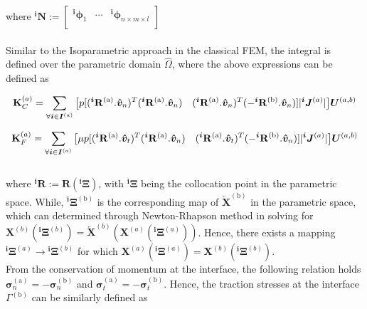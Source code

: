 where ${}^{\bm i} \bm N := 
\begin{bmatrix}
{}^{\bm i} \bm \phi_{1} &\cdots   &{}^{\bm i}\bm \phi_{n\times m \times l} \\ 
\end{bmatrix}$\\
\\
Similar to the Isoparametric approach in the classical FEM, the integral is defined over the parametric domain $\hat \Omega$, where the above expressions can be defined as

\begin{equation}\label{cont_dis2}
\mathbf{K}^{(a)}_C=
\sum_{\forall \bm i \in \bm I^{(a)}} \big[ p[({}^{\bm i} \mathbf{R}^{\mathrm{(a)}}.\bm{\hat{v}}_n)^T({}^{\bm i}\mathbf{R}^{\mathrm{(a)}}.\bm{\hat{v}}_n) \quad({}^{\bm i} \mathbf{R}^{\mathrm{(a)}}.\bm{\hat{v}}_n)^T(-{}^{\bm i} \mathbf{R}^{\mathrm{(b)}}.\bm{\hat{v}}_n)] |{}^{\bm i} \bm J^{(a)}| \big] \bm U^{(a,b)}\\
\end{equation}

\begin{equation}\label{fric_dis2}
\mathbf{K}^{(a)}_F=
\sum_{\forall \bm i \in \bm I^{(a)}} \big[ \mu p[({}^{\bm i} \mathbf{R}^{\mathrm{(a)}}.\bm{\hat{v}}_t)^T({}^{\bm i}\mathbf{R}^{\mathrm{(a)}}.\bm{\hat{v}}_n) \quad({}^{\bm i} \mathbf{R}^{\mathrm{(a)}}.\bm{\hat{v}}_t)^T(-{}^{\bm i} \mathbf{R}^{\mathrm{(b)}}.\bm{\hat{v}}_n)] |{}^{\bm i} \bm J^{(a)}| \big] \bm U^{(a,b)}\\
\end{equation}\\

where ${}^{\bm i}\mathbf{R} := \mathbf{R} ({}^{\bm i}\bm \Xi)$, with ${}^{\bm i}\bm \Xi$ being the collocation point in the parametric space. 
While, ${}^{\bm i}\bm \Xi^{\mathrm{(b)}}$ is the corresponding map of $\overleftarrow{\bm X}^{\mathrm{(b)}}$ in the parametric space, which can determined through Newton-Rhapson method in solving for ${\bm X}^{(b)}({}^{\bm i}\bm \Xi^{(b)})=\overleftarrow{\bm X}^{(b)}(\bm X^{(a)}({}^{\bm i} \bm \Xi^{(a)}))$.
Hence, there exists a mapping ${}^{\bm i} \bm \Xi^{(a)} \rightarrow {}^{\bm i} \bm \Xi^{(b)}$ for which $\bm X^{(a)}({}^{\bm i} \bm \Xi^{(a)})= {\bm X}^{(b)}({}^{\bm i}\bm \Xi^{(b)})$.\\

From the conservation of momentum at the interface, the following relation holds $\bm{\sigma}^{\mathrm{(a)}}_n = - \bm{\sigma}^{\mathrm{(b)}}_n$ and $\bm{\sigma}^{\mathrm{(a)}}_t = - \bm{\sigma}^{\mathrm{(b)}}_t$. Hence, the traction stresses at the interface $\Gamma^{\mathrm{(b)}}$ can be similarly defined as

